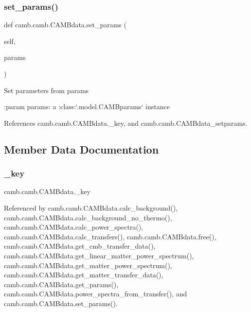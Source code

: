 \subsubsection{\texorpdfstring{set\+\_\+params()}{set\_params()}}
{\footnotesize\ttfamily def camb.\+camb.\+C\+A\+M\+Bdata.\+set\+\_\+params (\begin{DoxyParamCaption}\item[{}]{self,  }\item[{}]{params }\end{DoxyParamCaption})}

\begin{DoxyVerb}Set parameters from params

:param params: a :class:`.model.CAMBparams` instance
\end{DoxyVerb}
 

References camb.\+camb.\+C\+A\+M\+Bdata.\+\_\+key, and camb.\+camb.\+C\+A\+M\+Bdata\+\_\+setparams.



\subsection{Member Data Documentation}
\mbox{\label{classcamb_1_1camb_1_1CAMBdata_a2ba9e1f911e308e1b0d72bd203dc2f3f}} 
\subsubsection{\texorpdfstring{\+\_\+key}{\_key}}
{\footnotesize\ttfamily camb.\+camb.\+C\+A\+M\+Bdata.\+\_\+key\hspace{0.3cm}{\ttfamily [private]}}



Referenced by camb.\+camb.\+C\+A\+M\+Bdata.\+calc\+\_\+background(), camb.\+camb.\+C\+A\+M\+Bdata.\+calc\+\_\+background\+\_\+no\+\_\+thermo(), camb.\+camb.\+C\+A\+M\+Bdata.\+calc\+\_\+power\+\_\+spectra(), camb.\+camb.\+C\+A\+M\+Bdata.\+calc\+\_\+transfers(), camb.\+camb.\+C\+A\+M\+Bdata.\+free(), camb.\+camb.\+C\+A\+M\+Bdata.\+get\+\_\+cmb\+\_\+transfer\+\_\+data(), camb.\+camb.\+C\+A\+M\+Bdata.\+get\+\_\+linear\+\_\+matter\+\_\+power\+\_\+spectrum(), camb.\+camb.\+C\+A\+M\+Bdata.\+get\+\_\+matter\+\_\+power\+\_\+spectrum(), camb.\+camb.\+C\+A\+M\+Bdata.\+get\+\_\+matter\+\_\+transfer\+\_\+data(), camb.\+camb.\+C\+A\+M\+Bdata.\+get\+\_\+params(), camb.\+camb.\+C\+A\+M\+Bdata.\+power\+\_\+spectra\+\_\+from\+\_\+transfer(), and camb.\+camb.\+C\+A\+M\+Bdata.\+set\+\_\+params().

